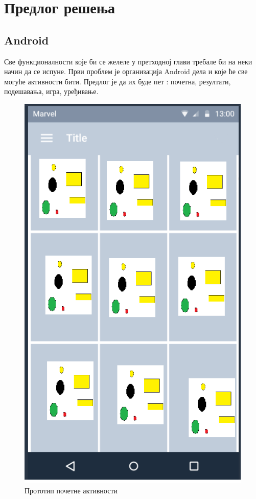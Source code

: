 \chapter{Предлог решења} \label{ModelProposal}
\section{Android}
Све функционалности које би се желеле у претходној глави требале би на неки начин да се испуне. Први проблем је организација Android дела и које ће све могуће активности бити. Предлог је да их буде пет : почетна, резултати, подешавања, игра, уређивање.
\begin{figure}[htb!]
\begin{center}
\includegraphics[scale=.5]{pictures/prototype/mainActivity}
\caption{Прототип почетне активности}\label{fig:prototypeBeginActivity}
\end{center}

\end{figure}

